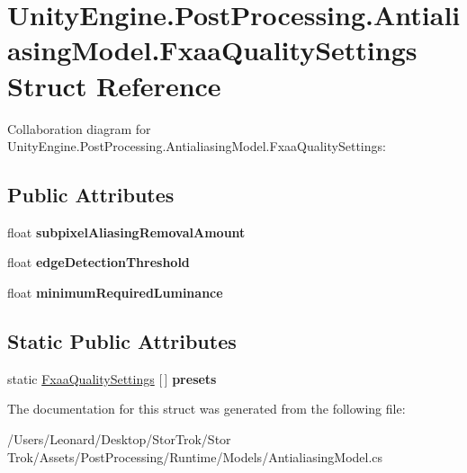 \hypertarget{struct_unity_engine_1_1_post_processing_1_1_antialiasing_model_1_1_fxaa_quality_settings}{}\section{Unity\+Engine.\+Post\+Processing.\+Antialiasing\+Model.\+Fxaa\+Quality\+Settings Struct Reference}
\label{struct_unity_engine_1_1_post_processing_1_1_antialiasing_model_1_1_fxaa_quality_settings}


Collaboration diagram for Unity\+Engine.\+Post\+Processing.\+Antialiasing\+Model.\+Fxaa\+Quality\+Settings\+:
\subsection*{Public Attributes}
\begin{DoxyCompactItemize}
\item 
\mbox{\label{struct_unity_engine_1_1_post_processing_1_1_antialiasing_model_1_1_fxaa_quality_settings_ac514fdce358d2574ff6077c396d6f21e}} 
float {\bfseries subpixel\+Aliasing\+Removal\+Amount}
\item 
\mbox{\label{struct_unity_engine_1_1_post_processing_1_1_antialiasing_model_1_1_fxaa_quality_settings_acdbd8b0638ef670b1cf306486c37224c}} 
float {\bfseries edge\+Detection\+Threshold}
\item 
\mbox{\label{struct_unity_engine_1_1_post_processing_1_1_antialiasing_model_1_1_fxaa_quality_settings_a9d0a9883141d960b0e9e84aa08d4f287}} 
float {\bfseries minimum\+Required\+Luminance}
\end{DoxyCompactItemize}
\subsection*{Static Public Attributes}
\begin{DoxyCompactItemize}
\item 
\mbox{\label{struct_unity_engine_1_1_post_processing_1_1_antialiasing_model_1_1_fxaa_quality_settings_aa0de93d00805e6023393a52a6434a3b6}} 
static \hyperlink{struct_unity_engine_1_1_post_processing_1_1_antialiasing_model_1_1_fxaa_quality_settings}{Fxaa\+Quality\+Settings} \mbox{[}$\,$\mbox{]} {\bfseries presets}
\end{DoxyCompactItemize}


The documentation for this struct was generated from the following file\+:\begin{DoxyCompactItemize}
\item 
/\+Users/\+Leonard/\+Desktop/\+Stor\+Trok/\+Stor Trok/\+Assets/\+Post\+Processing/\+Runtime/\+Models/Antialiasing\+Model.\+cs\end{DoxyCompactItemize}
